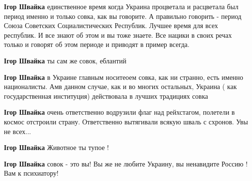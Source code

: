 \begin{itemize}
\begin{itemize}
\textbf{Ігор Швайка} единственное время когда Украина процветала и расцветала
был период именно и только совка, как вы говорите. А правильно говорить -
период Союза Советских Социалистических Республик. Лучшее время для всех
республик. И все знают об этом и вы тоже знаете. Все нацики в своих речах
только и говорят об этом периоде и приводят в пример всегда.

 
\textbf{Ігор Швайка} ты сам же совок, еблантий

 
\textbf{Ігор Швайка} в Украине главным носитеоем совка, как ни странно, есть
именно националисты. Амв данном случае, как и во многих остальных, Украина (
как государственная институция) действовала в лучших традициях совка


 
\textbf{Ігор Швайка} очень ответственно водрузили флаг над рейхстагом, полетели
в космос отстроили страну. Ответственно вытягивали всякую шваль с схронов. Увы
не всех...

 
\textbf{Ігор Швайка}
Животное ты тупое !

 
\textbf{Ігор Швайка} совок - это вы! Вы же не любите Украину, вы ненавидите Россию ! Вам к психиатору!


\end{itemize}
\end{itemize}
